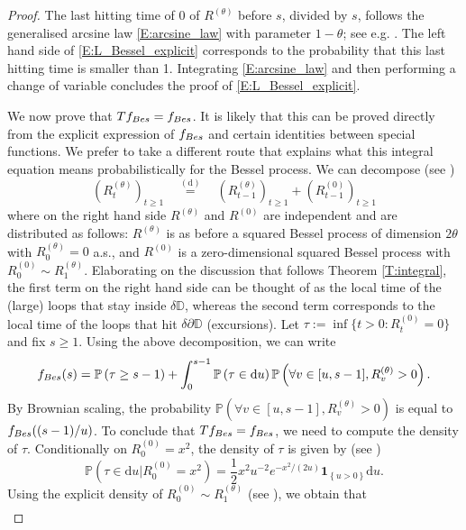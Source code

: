 \documentclass[11pt]{article}
\theoremstyle{remark}
\newcommand{\D}{\mathbb{D}}
\newcommand{\Prob}[1]{\mathbb{P} \left( #1 \right) }
\newcommand{\indic}[1]{ \mathbf{1}_{ \left\{ #1 \right\} } }
\renewcommand{\d}{\mathrm{d}}
\numberwithin{equation}{section}
\begin{document}
\begin{proof}
The last hitting time of 0 of $R^{(\theta)}$ before $s$, divided by $s$, follows the generalised arcsine law \eqref{E:arcsine_law} with parameter $1-\theta$; see e.g. \cite[Proposition 3.1]{Bertoin1999}. The left hand side of \eqref{E:L_Bessel_explicit} corresponds to the probability that this last hitting time is smaller than 1. Integrating \eqref{E:arcsine_law} and then performing a change of variable concludes the proof of \eqref{E:L_Bessel_explicit}.

We now prove that $T f_{\rm Bes} = f_{\rm Bes}$.
It is likely that this can be proved directly from the explicit expression of $f_{\rm Bes}$ and certain identities between special functions. We prefer to take a different route that explains what this integral equation means probabilistically for the Bessel process.
We can decompose (see \cite{shiga1973bessel})
\[
(R_t^{(\theta)})_{t \geq 1}
\quad \overset{\mathrm{(d)}}{=} \quad
(R_{t-1}^{(\theta)})_{t \geq 1} + (R^{(0)}_{t-1})_{t \geq 1}
\]
where on the right hand side $R^{(\theta)}$ and $R^{(0)}$ are independent and are distributed as follows: $R^{(\theta)}$ is as before a squared Bessel process of dimension $2\theta$ with $R_0^{(\theta)} = 0$ a.s., and $R^{(0)}$ is a zero-dimensional squared Bessel process with $R_0^{(0)} \sim R_1^{(\theta)}$.
Elaborating on the discussion that follows Theorem \ref{T:integral}, the first term on the right hand side can be thought of as the local time of the (large) loops that stay inside $\delta \D$, whereas the second term corresponds to the local time of the loops that hit $\delta \partial \D$ (excursions).
Let $\tau := \inf \{ t>0: R^{(0)}_t = 0 \}$ and fix $s \geq 1$. Using the above decomposition, we can write
\begin{equation}
\label{E:Bessel1}
f_{\rm Bes}(s) = \Prob{ \tau \geq s-1 } + \int_0^{s-1} \Prob{ \tau \in \d u } \Prob{ \forall v \in [u,s-1], R_v^{(\theta)} >0 }.
\end{equation}
By Brownian scaling,
the probability $\Prob{ \forall v \in [u,s-1], R_v^{(\theta)} >0 }$ is equal to $f_{\rm Bes}((s-1)/u)$. To conclude that $Tf_{\rm Bes} = f_{\rm Bes}$, we need to compute the density of $\tau$. Conditionally on $R_0^{(0)} = x^2$, the density of $\tau$ is given by (see \cite[Proposition 2.9]{LawlerBessel})
\[
\Prob{ \tau \in \d u \vert R_0^{(0)} = x^2 }
= \frac12 x^2 u^{-2} e^{-x^2 / (2u) } \indic{u >0} \d u.
\]
Using the explicit density of $R_0^{(0)} \sim R_1^{(\theta)}$ (see \cite[Equation (37)]{LawlerBessel}), we obtain that
\begin{align*}

\end{align*}
\end{proof}
\end{document}
